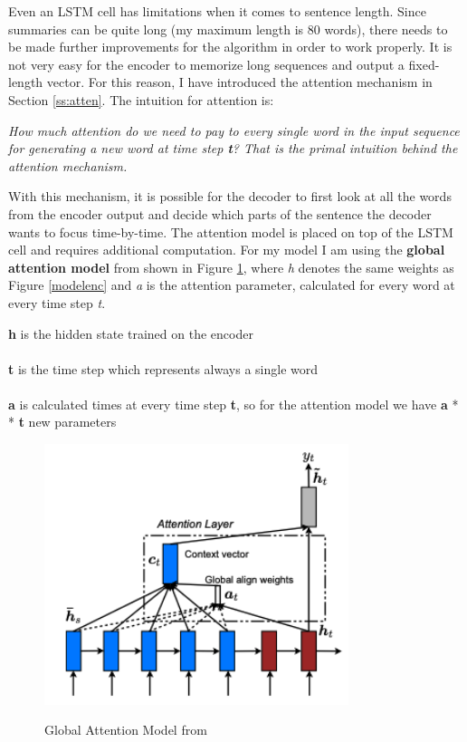 Even an LSTM cell has limitations when it comes to sentence length. Since summaries can be quite long (my maximum length is 80 words), there needs to be made further improvements for the algorithm in order to work properly. It is not very easy for the encoder to memorize long sequences and output a fixed-length vector. For this reason, I have introduced the attention mechanism in Section \ref{ss:atten}. The intuition for attention is:

\begin{tcolorbox}
	\textit{How much attention do we need to pay to every single word in the input sequence for generating a new word at time step \textbf{t}? That is the primal intuition behind the attention mechanism.}
\end{tcolorbox}

With this mechanism, it is possible for the decoder to first look at all the words from the encoder output and decide which parts of the sentence the decoder wants to focus time-by-time. The attention model is placed on top of the LSTM cell and requires additional computation. For my model I am using the \textbf{global attention model} from \cite{effectiveattn} shown in Figure \ref{glob}, where \textit{h} denotes the same weights as Figure \ref{modelenc} and \textit{a} is the attention parameter, calculated for every word at every time step \textit{t}.

\begin{tcolorbox}
	\textbf{h} is the hidden state trained on the encoder \\ \\
	\textbf{t} is the time step which represents always a single word \\ \\
	\textbf{a} is calculated  times at every time step \textbf{t}, so for the attention model we have \textbf{a} *  \textbf{t} new parameters
\end{tcolorbox}

\begin{figure}
	\begin{center}
		\includegraphics[width=3.5in]{photos/glob_att}\\
		\caption{Global Attention Model from \cite{effectiveattn}}\label{glob}
	\end{center}
\end{figure}

